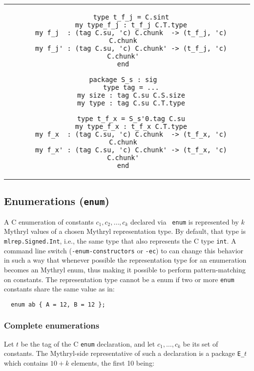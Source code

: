 \begin{small}
\begin{center}
\begin{tabular}{c|c}
\begin{minipage}{4in}
\begin{verbatim}
    type t_f_j = C.sint
    my type_f_j : t_f_j C.T.type
    my f_j  : (tag C.su, 'c) C.chunk  -> (t_f_j, 'c) C.chunk
    my f_j' : (tag C.su, 'c) C.chunk' -> (t_f_j, 'c) C.chunk'
end

package S_s : sig
    type tag = ...
    my size : tag C.su C.S.size
    my type : tag C.su C.T.type

    type t_f_x = S_s'0.tag C.su
    my type_f_x : t_f_x C.T.type
    my f_x  : (tag C.su, 'c) C.chunk  -> (t_f_x, 'c) C.chunk
    my f_x' : (tag C.su, 'c) C.chunk' -> (t_f_x, 'c) C.chunk'
end

\end{verbatim}
\end{minipage}  
\end{tabular}
\end{center}
\end{small}

\subsection{Enumerations ({\tt enum})}

A C enumeration of constants $c_1, c_2, \ldots, c_k$ declared via {\tt
  enum} is represented by $k$ Mythryl values of a chosen Mythryl representation
type.  By default, that type is {\tt mlrep.Signed.Int}, i.e., the same
type that also represents the C type {\tt int}.  A command line switch
({\tt -enum-constructors} or {\tt -ec}) to {\cgluemaker} can change this
behavior in such a way that whenever possible the representation type
for an enumeration becomes an Mythryl enum, thus making it possible to
perform pattern-matching on constants.  The representation type cannot be a
enum if two or more {\tt enum} constants share the same value as in:

\begin{verbatim}
  enum ab { A = 12, B = 12 };
\end{verbatim}

\subsubsection*{Complete enumerations}

Let $t$ be the tag of the C {\tt enum} declaration, and let
$c_1,\ldots,c_k$ be its set of constants.  The Mythryl-side representative
of such a declaration is a package {\tt E\_$t$} which contains $10+k$
elements, the first 10 being:

